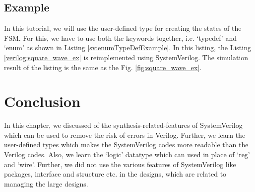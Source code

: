 \subsection{Example} \label{sec:enumTypeDefExample}
In this tutorial, we will use the user-defined type for creating the states of the FSM. For this, we have to use both the keywords together, i.e. `typedef' and `enum' as shown in Listing \ref{sv:enumTypeDefExample}. In this listing, the Listing \ref{verilog:square_wave_ex} is reimplemented using SystemVerilog. The simulation result of the listing is the same as the Fig. \ref{fig:square_wave_ex}. 




\section{Conclusion}
In this chapter, we discussed of the synthesis-related-features of SystemVerilog which can be used to remove the risk of errors in Verilog. Further, we learn the user-defined types which makes the SystemVerilog codes more readable than the Verilog codes. Also, we learn the `logic' datatype which can used in place of `reg' and `wire'. Further, we did not use the various features of SystemVerilog like packages, interface and structure etc. in the designs, which are related to managing the large designs.